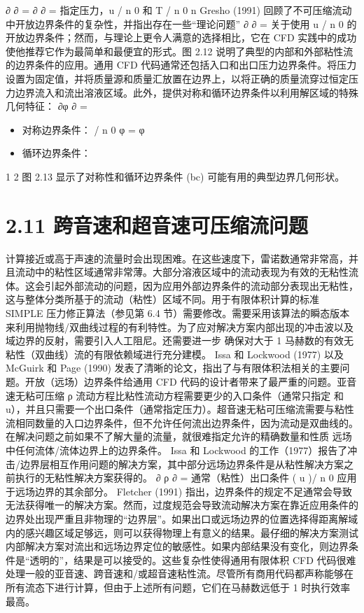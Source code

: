 \documentclass[11pt,a4paper,openany,fontset=none]{ctexbook}
\begin{document}
∂ ∂ = ∂ ∂ = 指定压力，u / n 0 和 T / n 0 n
Gresho (1991) 回顾了不可压缩流动中开放边界条件的复杂性，并指出存在一些“理论问题” ∂ ∂ = 关于使用 u / n 0 的开放边界条件；然而，与理论上更令人满意的选择相比，它在 CFD 实践中的成功使他推荐它作为最简单和最便宜的形式。图 2.12 说明了典型的内部和外部粘性流的边界条件的应用。通用 CFD 代码通常还包括入口和出口压力边界条件。将压力设置为固定值，并将质量源和质量汇放置在边界上，以将正确的质量流穿过恒定压力边界流入和流出溶液区域。此外，提供对称和循环边界条件以利用解区域的特殊几何特征： ∂φ ∂ =

\begin{itemize}

\item 对称边界条件： / n 0 φ = φ

\item 循环边界条件：

\end{itemize}

1 2 图 2.13 显示了对称性和循环边界条件 (bc) 可能有用的典型边界几何形状。

\section*{2.11 跨音速和超音速可压缩流问题}

计算接近或高于声速的流量时会出现困难。在这些速度下，雷诺数通常非常高，并且流动中的粘性区域通常非常薄。大部分溶液区域中的流动表现为有效的无粘性流体。这会引起外部流动的问题，因为应用外部边界条件的流动部分表现出无粘性，这与整体分类所基于的流动（粘性）区域不同。用于有限体积计算的标准 SIMPLE 压力修正算法（参见第 6.4 节）需要修改。需要采用该算法的瞬态版本来利用抛物线/双曲线过程的有利特性。为了应对解决方案内部出现的冲击波以及域边界的反射，需要引入人工阻尼。还需要进一步
确保对大于 1 马赫数的有效无粘性（双曲线）流的有限依赖域进行充分建模。 Issa 和 Lockwood (1977) 以及 McGuirk 和 Page (1990) 发表了清晰的论文，指出了与有限体积法相关的主要问题。开放（远场）边界条件给通用 CFD 代码的设计者带来了最严重的问题。亚音速无粘可压缩 ρ 流动方程比粘性流动方程需要更少的入口条件（通常只指定 和 u），并且只需要一个出口条件（通常指定压力）。超音速无粘可压缩流需要与粘性流相同数量的入口边界条件，但不允许任何流出边界条件，因为流动是双曲线的。在解决问题之前如果不了解大量的流量，就很难指定允许的精确数量和性质
远场中任何流体/流体边界上的边界条件。 Issa 和 Lockwood 的工作（1977）报告了冲击/边界层相互作用问题的解决方案，其中部分远场边界条件是从粘性解决方案之前执行的无粘性解决方案获得的。 ∂ ρ ∂ = 通常（粘性）出口条件 ( u )/ n 0 应用于远场边界的其余部分。 Fletcher (1991) 指出，边界条件的规定不足通常会导致无法获得唯一的解决方案。然而，过度规范会导致流动解决方案在靠近应用条件的边界处出现严重且非物理的“边界层”。如果出口或远场边界的位置选择得距离解域内的感兴趣区域足够远，则可以获得物理上有意义的结果。最仔细的解决方案测试内部解决方案对流出和远场边界定位的敏感性。如果内部结果没有变化，则边界条件是“透明的”，结果是可以接受的。这些复杂性使得通用有限体积 CFD 代码很难处理一般的亚音速、跨音速和/或超音速粘性流。尽管所有商用代码都声称能够在所有流态下进行计算，但由于上述所有问题，它们在马赫数远低于 1 时执行效率最高。
\end{document}
